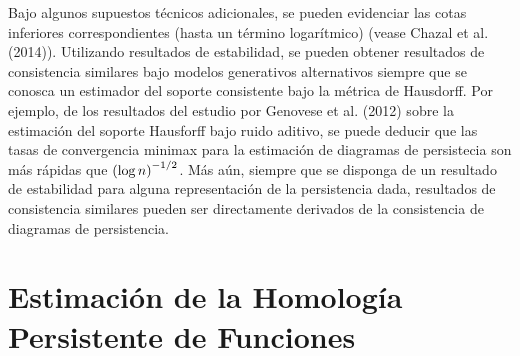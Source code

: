 Bajo algunos supuestos t\'ecnicos adicionales, se pueden evidenciar las cotas inferiores correspondientes
(hasta un t\'ermino logar\'itmico) (vease Chazal et al. (2014)\cite{Chazal2014b}).
Utilizando resultados de estabilidad, se pueden obtener resultados de consistencia similares
bajo modelos generativos alternativos siempre que se conosca un estimador del soporte
consistente bajo la m\'etrica de Hausdorff.
Por ejemplo, de los resultados del estudio por Genovese et al. (2012)\cite{Genovese2012}
sobre la estimaci\'on del soporte Hausforff bajo ruido aditivo,
se puede deducir que las tasas de convergencia minimax para la estimaci\'on de diagramas de persistecia
son m\'as r\'apidas que $\left(\log n\right)^{-1/2}$.
M\'as a\'un, siempre que se disponga de un resultado de estabilidad para alguna representaci\'on de la persistencia dada,
resultados de consistencia similares pueden ser directamente derivados de la consistencia de diagramas de persistencia.

\section*{Estimaci\'on de la Homolog\'ia Persistente de Funciones}
